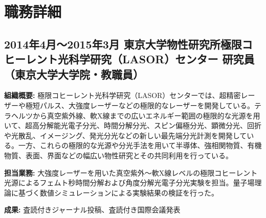 \documentclass[uplatex,a4j,10.5pt,dvipdfmx]{jsarticle}
\begin{document}
\section{職務詳細}

\subsection{2014年4月～2015年3月 東京大学物性研究所極限コヒーレント光科学研究（LASOR）センター 研究員 （東京大学大学院・教職員）}

\noindent\textbf{組織概要:} 極限コヒーレント光科学研究（LASOR）センターでは、超精密レーザーや極短パルス、大強度レーザーなどの極限的なレーザーを開発している。テラヘルツから真空紫外線、軟X線までの広いエネルギー範囲の極限的な光源を用いて、超高分解能光電子分光、時間分解分光、スピン偏極分光、顕微分光、回折や光散乱、イメージング、発光分光などの新しい最先端分光計測を開発している。一方、これらの極限的な光源や分光手法を用いて半導体、強相関物質、有機物質、表面、界面などの幅広い物性研究とその共同利用を行っている。

\noindent\textbf{担当業務:} 大強度レーザーを用いた真空紫外～軟X線レベルの極限コヒーレント光源によるフェムト秒時間分解および角度分解光電子分光実験を担当。量子場理論に基づく数値シミュレーションによる実験結果の検証を行った。

\noindent\textbf{成果:} 査読付きジャーナル投稿、査読付き国際会議発表

\newpage
\end{document}
